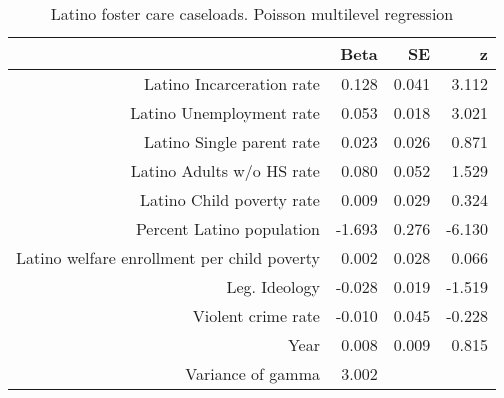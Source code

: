 \begin{table}[ht]
\centering
\begin{tabular}{rrrr}
  \hline
 & Beta & SE & z \\ 
  \hline
Latino Incarceration rate & 0.128 & 0.041 & 3.112 \\ 
  Latino Unemployment rate & 0.053 & 0.018 & 3.021 \\ 
  Latino Single parent rate & 0.023 & 0.026 & 0.871 \\ 
  Latino Adults w/o HS rate & 0.080 & 0.052 & 1.529 \\ 
  Latino Child poverty rate & 0.009 & 0.029 & 0.324 \\ 
  Percent Latino population & -1.693 & 0.276 & -6.130 \\ 
  Latino welfare enrollment per child poverty & 0.002 & 0.028 & 0.066 \\ 
  Leg. Ideology & -0.028 & 0.019 & -1.519 \\ 
  Violent crime rate & -0.010 & 0.045 & -0.228 \\ 
  Year & 0.008 & 0.009 & 0.815 \\ 
  Variance of gamma & 3.002 &  &  \\ 
   \hline
\end{tabular}
\caption{Latino foster care caseloads. Poisson multilevel regression} 
\label{l.c.tab}
\end{table}
